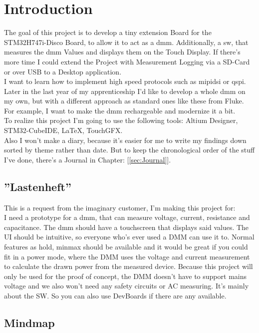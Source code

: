 \chapter{Introduction}
\label{cha:Introduction}


The goal of this project is to develop a tiny extension Board for the STM32H747i-Disco Board, to allow it to act as a \acs{dmm}. Additionally, a \acs{sw}, that measures the \acs{dmm} Values and displays them on the Touch Display. If there's more time I could extend the Project with Measurement Logging via a SD-Card or over USB to a Desktop application.
\\
I want to learn how to implement high speed protocols such as \acs{mipidsi} or \acs{qspi}. Later in the last year of my apprenticeship I'd like to develop a whole \acs{dmm} on my own, but with a different approach as standard ones like these from Fluke. For example, I want to make the \acs{dmm} rechargeable and modernize it a bit. 
\\
To realize this project I'm going to use the following tools: Altium Designer, STM32-CubeIDE, LaTeX, TouchGFX.
\\
Also I won't make a diary, because it's easier for me to write my findings down sorted by theme rather than date. But to keep the chronological order of the stuff I've done, there's a Journal in Chapter: [\ref{sec:Journal}].

\section{''Lastenheft''}
\label{sec:Lastenheft}
This is a request from the imaginary customer, I'm making this project for:
\\
I need a prototype for a \acs{dmm}, that can measure voltage, current, resistance and capacitance. The \acs{dmm} should have a touchscreen that displays said values. The UI should be intuitive, so everyone who's ever used a DMM can use it to. Normal features as hold, minmax should be available and it would be great if you could fit in a power mode, where the DMM uses the voltage and current measurement to calculate the drawn power from the measured device. Because this project will only be used for the proof of concept, the DMM doesn't have to support mains voltage and we also won't need any safety circuits or AC measuring. It's mainly about the SW. So you can also use DevBoards if there are any available. 

\newpage

\section{Mindmap}
\label{sec:Mindmap}

